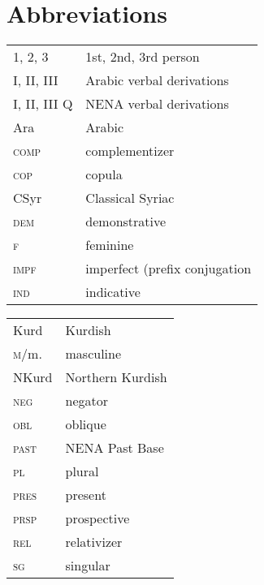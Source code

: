\documentclass[output=paper]{langsci/langscibook}
\begin{document}
\section*{Abbreviations}
\begin{tabularx}{.5\textwidth}{@{}lQ@{}}
\textsc{1, 2, 3} & 1st, 2nd, 3rd person \\
I, II, III   & Arabic verbal derivations\\
I, II, III Q    & NENA verbal derivations\\
Ara            & Arabic\\
\textsc{comp}    & complementizer\\
\textsc{cop}     & copula\\
CSyr           & Classical Syriac\\
\textsc{dem}     & demonstrative \\
\textsc{f}    & feminine\\
\textsc{impf}   & imperfect (prefix conjugation  \\
\textsc{ind}     & indicative\\
\end{tabularx}%
\begin{tabularx}{.5\textwidth}{@{}lQ@{}}
Kurd           & Kurdish\\
\textsc{m}/m.    & masculine\\
NKurd        & Northern Kurdish \\ 
\textsc{neg}    & negator\\
\textsc{obl}     & oblique\\
\textsc{past}   & NENA Past Base\\
\textsc{pl}  & plural\\
\textsc{pres}    & present \\
\textsc{prsp}    & prospective \\
\textsc{rel}     & relativizer\\
\textsc{sg}  & singular

\end{tabularx}%
\end{document}
